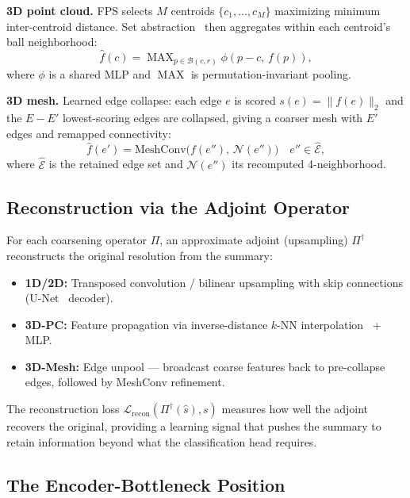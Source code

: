 \documentclass[10pt,conference]{IEEEtran}
\DeclareMathOperator{\MAX}{MAX}
\begin{document}
\noindent\textbf{3D point cloud.}  FPS selects $M$ centroids
$\{c_1,\ldots,c_M\}$ maximizing minimum inter-centroid distance.  Set
abstraction~\cite{qi2017pointnetplusplus} then aggregates within each
centroid's ball neighborhood:
\begin{equation}
  \hat{f}(c) = \MAX_{p\in\mathcal{B}(c,r)} \phi(p - c,\,f(p)),
  \label{eq:fps_sa}
\end{equation}
where $\phi$ is a shared MLP and $\MAX$ is permutation-invariant pooling.

\noindent\textbf{3D mesh.}  Learned edge collapse: each edge $e$ is
scored $s(e) = \|f(e)\|_2$ and the $E - E'$ lowest-scoring edges are
collapsed, giving a coarser mesh with $E'$ edges and remapped connectivity:
\begin{equation}
  \hat{f}(e') = \text{MeshConv}\bigl(f(e''),\,\mathcal{N}(e'')\bigr)
    \quad e''\in\hat{\mathcal{E}},
  \label{eq:edgecollapse}
\end{equation}
where $\hat{\mathcal{E}}$ is the retained edge set and
$\mathcal{N}(e'')$ its recomputed 4-neighborhood.

\subsection{Reconstruction via the Adjoint Operator}

For each coarsening operator $\Pi$, an approximate adjoint (upsampling)
$\Pi^\dagger$ reconstructs the original resolution from the summary:

\begin{itemize}
  \item \textbf{1D/2D:} Transposed convolution / bilinear upsampling
    with skip connections (U-Net~\cite{ronneberger2015unet} decoder).
  \item \textbf{3D-PC:} Feature propagation via inverse-distance
    $k$-NN interpolation~\cite{qi2017pointnetplusplus} + MLP.
  \item \textbf{3D-Mesh:} Edge unpool — broadcast coarse features
    back to pre-collapse edges, followed by MeshConv refinement.
\end{itemize}

The reconstruction loss $\mathcal{L}_{\mathrm{recon}}(\Pi^\dagger(\hat{s}),s)$
measures how well the adjoint recovers the original, providing a learning
signal that pushes the summary to retain information beyond what the
classification head requires.

\subsection{The Encoder-Bottleneck Position}
\end{document}

